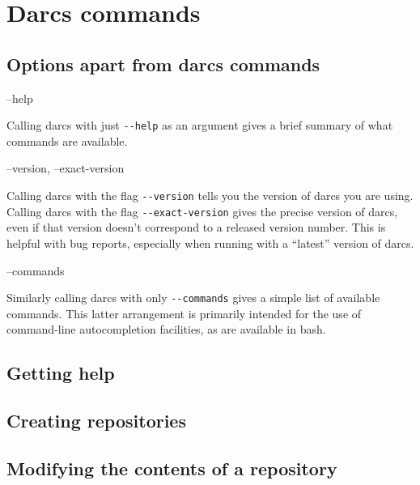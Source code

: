 \documentclass{book}
\begin{document}






\chapter{Darcs commands}



\section{Options apart from darcs commands}
\begin{options}
--help
\end{options}
Calling darcs with just \verb|--help| as an argument gives a brief
summary of what commands are available.
\begin{options}
--version, --exact-version
\end{options}
Calling darcs with the flag \verb|--version| tells you the version of
darcs you are using.  Calling darcs with the flag \verb|--exact-version|
gives the precise version of darcs, even if that version doesn't correspond
to a released version number.  This is helpful with bug reports, especially
when running with a ``latest'' version of darcs.
\begin{options}
--commands
\end{options}
Similarly calling darcs with only \verb|--commands| gives a simple list
of available commands.  This latter arrangement is primarily intended for
the use of command-line autocompletion facilities, as are available in
bash.

\section{Getting help}



\section{Creating repositories}







\section{Modifying the contents of a repository}
\end{document}
